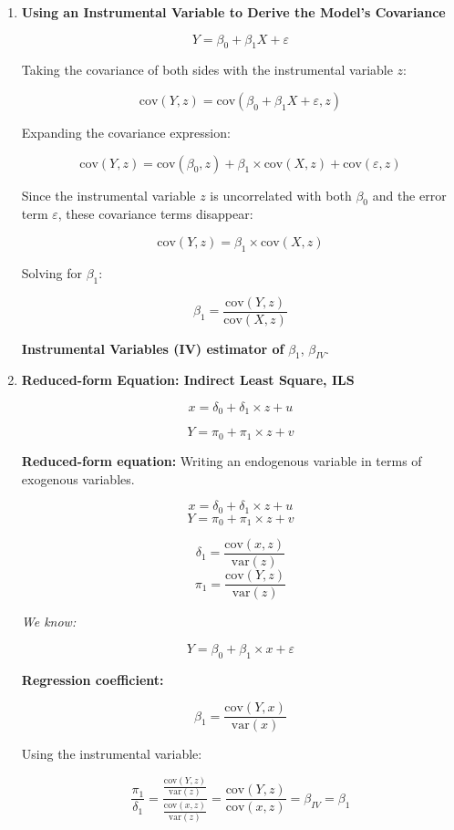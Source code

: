 \documentclass[12pt, oneside]{article}
\begin{document}
\begin{enumerate}
\item \textbf{Using an Instrumental Variable to Derive the Model's Covariance}

\[
Y = \beta_0 + \beta_1 X + \varepsilon
\]

Taking the covariance of both sides with the instrumental variable \( z \):

\[
\text{cov}(Y, z) = \text{cov}(\beta_0 + \beta_1 X + \varepsilon, z)
\]

Expanding the covariance expression:

\[
\text{cov}(Y, z) = \text{cov}(\beta_0, z) + \beta_1 \times \text{cov}(X, z) + \text{cov}(\varepsilon, z)
\]

Since the instrumental variable \( z \) is uncorrelated with both \( \beta_0 \) and the error term \( \varepsilon \), these covariance terms disappear:

\[
\text{cov}(Y, z) = \beta_1 \times \text{cov}(X, z)
\]

Solving for \( \beta_1 \):

\[
\beta_1 = \frac{\text{cov}(Y, z)}{\text{cov}(X, z)}
\]

\textbf{Instrumental Variables (IV) estimator of} \( \beta_1 \), \( \beta_{IV} \).

\item \textbf{Reduced-form Equation: Indirect Least Square, ILS}

\[
x = \delta_0 + \delta_1 \times z + u
\]

\[
Y = \pi_0 + \pi_1 \times z + v
\]

\textbf{Reduced-form equation:} Writing an endogenous variable in terms of exogenous variables.

\[
x = \delta_0 + \delta_1 \times z + u
\]
\[
Y = \pi_0 + \pi_1 \times z + v
\]

\[
\delta_1 = \frac{\text{cov}(x, z)}{\text{var}(z)}
\]
\[
\pi_1 = \frac{\text{cov}(Y, z)}{\text{var}(z)}
\]

\textit{We know:}

\[
Y = \beta_0 + \beta_1 \times x + \varepsilon
\]

\textbf{Regression coefficient:}

\[
\beta_1 = \frac{\text{cov}(Y, x)}{\text{var}(x)}
\]

Using the instrumental variable:

\[
\frac{\pi_1}{\delta_1} = \frac{\frac{\text{cov}(Y, z)}{\text{var}(z)}}{\frac{\text{cov}(x, z)}{\text{var}(z)}} = \frac{\text{cov}(Y, z)}{\text{cov}(x, z)}
= \beta_{IV} = \beta_1
\]


\end{enumerate}
\end{document}
